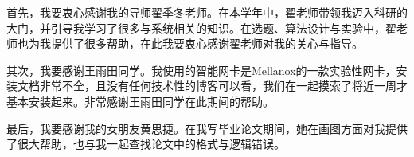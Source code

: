 \begin{acknowledgement}
  首先，我要衷心感谢我的导师翟季冬老师。在本学年中，翟老师带领我迈入科研的大门，并引导我学习了很多与系统相关的知识。在选题、算法设计与实验中，翟老师也为我提供了很多帮助，在此我要衷心感谢翟老师对我的关心与指导。

  其次，我要感谢王雨田同学。我使用的智能网卡是Mellanox的一款实验性网卡，安装文档非常不全，且没有任何技术性的博客可以看，我们在一起摸索了将近一周才基本安装起来。非常感谢王雨田同学在此期间的帮助。

  最后，我要感谢我的女朋友黄思捷。在我写毕业论文期间，她在画图方面对我提供了很大帮助，也与我一起查找论文中的格式与逻辑错误。
\end{acknowledgement}
